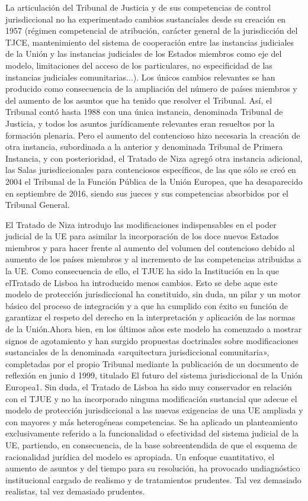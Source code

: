 \documentclass[10pt,a4paper]{article}
\begin{document}
La articulación del Tribunal de Justicia y de sus competencias de control jurisdiccional no ha experimentado cambios sustanciales desde su creación en 1957 (régimen competencial de atribución, carácter general de la jurisdicción del TJCE, mantenimiento del sistema de cooperación entre las instancias judiciales de la Unión y las instancias judiciales de los Estados miembros como eje del modelo, limitaciones del acceso de los particulares, no especificidad de las instancias judiciales comunitarias...). Los únicos cambios relevantes se han producido como consecuencia de la ampliación del número de países miembros y del aumento de los asuntos que ha tenido que resolver el Tribunal. Así, el Tribunal contó hasta 1988 con una única instancia, denominada Tribunal de Justicia, y todos los asuntos jurídicamente relevantes eran resueltos por la formación plenaria. Pero el aumento del contencioso hizo necesaria la creación de otra instancia, subordinada a la anterior y denominada Tribunal de Primera Instancia, y con posterioridad, el Tratado de Niza agregó otra instancia adicional, las Salas jurisdiccionales para contenciosos específicos, de las que sólo se creó en 2004 el Tribunal de la Función Pública de la Unión Europea, que ha desaparecido en septiembre de 2016, siendo sus jueces y sus competencias absorbidos por el Tribunal General.

El Tratado de Niza introdujo las modificaciones indispensables en el poder judicial de la UE para asimilar la incorporación de los doce nuevos Estados miembros y para hacer frente al aumento del volumen del contencioso debido al aumento de los países miembros y al incremento de las competencias atribuidas a la UE. Como consecuencia de ello, el TJUE ha sido la Institución en la que elTratado de Lisboa ha introducido menos cambios. Esto se debe aque este modelo de protección jurisdiccional ha constituido, sin duda, un pilar y un motor básico del proceso de integración y a que ha cumplido con éxito su función de garantizar el respeto del derecho en la interpretación y aplicación de las normas de la Unión.Ahora bien, en los últimos años este modelo ha comenzado a mostrar signos de agotamiento y han surgido propuestas doctrinales sobre modificaciones sustanciales de la denominada «arquitectura jurisdiccional comunitaria», completadas por el propio Tribunal mediante la publicación de un documento de reflexión en junio d 1999, titulado El futuro del sistema jurisdiccional de la Unión Europea1. Sin duda, el Tratado de Lisboa ha sido muy conservador en relación con el TJUE y no ha incorporado ninguna modificación sustancial que adecue el modelo de protección jurisdiccional a las nuevas exigencias de una UE ampliada y con mayores y más heterogéneas competencias. Se ha aplicado un planteamiento exclusivamente referido a la funcionalidad o efectividad del sistema judicial de la UE, partiendo, en consecuencia, de la base sobreentendida de que el esquema de racionalidad jurídica del modelo es apropiada. Un enfoque cuantitativo, el aumento de asuntos y del tiempo para su resolución, ha provocado undiagnóstico institucional cargado de realismo y de tratamientos prudentes. Tal vez demasiado realistas, tal vez demasiado prudentes.
\end{document}
